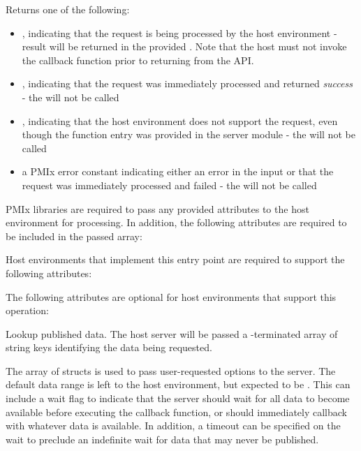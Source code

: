 Returns one of the following:

\begin{itemize}
    \item {}, indicating that the request is being processed by the host environment - result will be returned in the provided . Note that the host must not invoke the callback function prior to returning from the \ac{API}.
    \item {}, indicating that the request was immediately processed and returned \textit{success} - the  will not be called
    \item {}, indicating that the host environment does not support the request, even though the function entry was provided in the server module - the  will not be called
    \item a PMIx error constant indicating either an error in the input or that the request was immediately processed and failed - the  will not be called
\end{itemize}

\reqattrstart
\ac{PMIx} libraries are required to pass any provided attributes to the host environment for processing. In addition, the following attributes are required to be included in the passed  array:


\divider

Host environments that implement this entry point are required to support the following attributes:


\reqattrend

\optattrstart
The following attributes are optional for host environments that support this operation:


\optattrend


\descr

Lookup published data.
The host server will be passed a -terminated array of string keys identifying the data being requested.

The array of  structs is used to pass user-requested options to the server. The default data range is left to the host environment, but expected to be .
This can include a wait flag to indicate that the server should wait for all data to become available before executing the callback function, or should immediately callback with whatever data is available.
In addition, a timeout can be specified on the wait to preclude an indefinite wait for data that may never be published.

